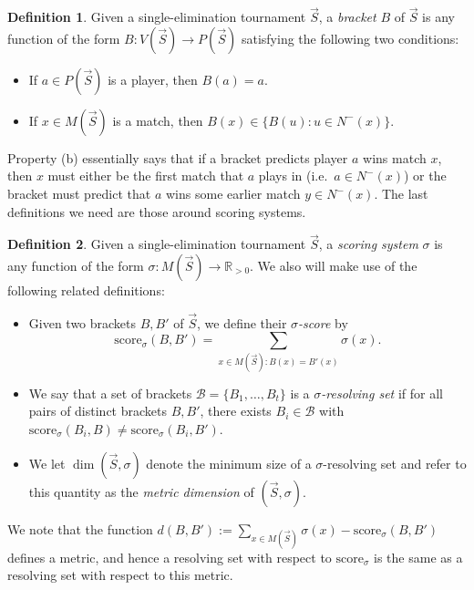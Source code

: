 \documentclass[12pt,letterpaper]{article}
\theoremstyle{definition}
\newtheorem{defn}{Definition}
\newcommand{\R}{\mathbb{R}}
\newcommand{\sig}{\sigma}
\renewcommand{\1}{\mathbbm{1}}
\renewcommand{\c}[1]{\mathcal{#1}}
\newcommand{\score}{\mathrm{score}}
\newcommand{\tour}{\vec{S}}
\begin{document}
\begin{defn}
	Given a single-elimination tournament $\tour$, a \textit{bracket} $B$ of $\tour$ is any function of the form $B:V(\tour)\to P(\tour)$ satisfying the following two conditions:
	\begin{itemize}
		\item[(a)] If $a\in P(\tour)$ is a player, then $B(a)=a$.
		\item[(b)] If $x\in M(\tour)$ is a match, then $B(x)\in \{B(u):u\in N^-(x)\}$.
	\end{itemize}
\end{defn}
Property (b) essentially says that if a bracket predicts player $a$ wins match $x$, then $x$ must either be the first match that $a$ plays in (i.e.\ $a\in N^-(x)$) or the bracket must predict that $a$ wins some earlier match $y\in N^-(x)$.  The last definitions we need are those around scoring systems.
\begin{defn}
	Given a single-elimination tournament $\tour$, a \textit{scoring system} $\sig$ is any function of the form $\sig:M(\tour)\to \R_{>0}$.  We also will make use of the following related definitions:
	\begin{itemize}
		\item Given two brackets $B,B'$ of $\tour$, we define their \textit{$\sig$-score} by
		\[\score_\sig(B,B')=\sum_{x\in M(\tour): B(x)=B'(x)}\sig(x).\]
		\item We say that a set of brackets $\c{B}=\{B_1,\ldots,B_t\}$ is a \textit{$\sig$-resolving set} if for all pairs of distinct brackets $B,B'$, there exists $B_i\in \c{B}$ with $\score_\sig(B_i,B)\ne \score_\sig(B_i,B')$.
		\item We let $\dim(\tour,\sig)$ denote the minimum size of a $\sig$-resolving set and refer to this quantity as the \textit{metric dimension} of $(\tour,\sig)$.
	\end{itemize}
\end{defn}
We note that the function $d(B,B'):=\sum_{x\in M(\tour)} \sig(x)-\score_\sig(B,B')$ defines a metric, and hence a resolving set with respect to  $\score_\sig$ is the same as a resolving set with respect to this metric.

\end{document}
